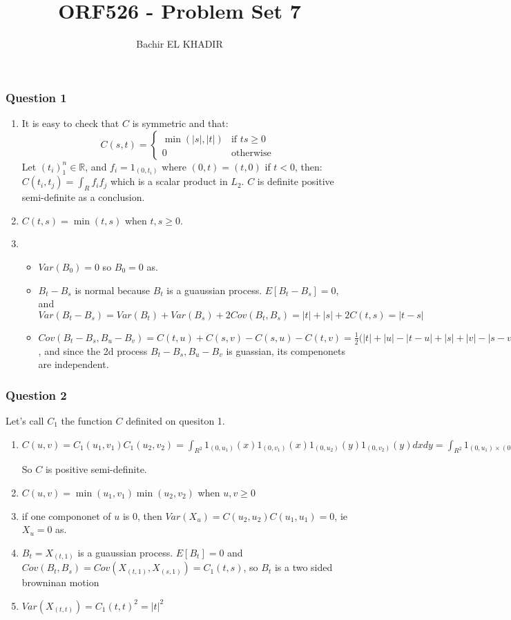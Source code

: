 \documentclass[12pt]{article}
\title{ORF526 - Problem Set 7}
\author{Bachir EL KHADIR }
\newcommand{\Q}[1]{\subsubsection*{Question #1}}
\begin{document}
\maketitle

\Q{1} 
\begin{enumerate}
\item
  It is easy to check that $C$ is symmetric and that:
\[
C(s,t) = \left\{ \begin{array}{cc}\min(|s|, |t|) & \text{if } ts \geq 0 \\ 0 & \text{otherwise}\end{array} \right.
\]
  Let $(t_i)_1^n \in \mathbb{R}$, and $f_i = 1_{(0, t_i)}$ where 
$(0, t) = (t, 0)$ if $t < 0$, then:  $C(t_i, t_j) = \int_R f_i f_j$ which is a scalar product in $L_2$.
  $C$ is definite positive semi-definite as a conclusion.

\item $C(t, s) = \min(t, s)$ when $t, s \ge 0$.

\item \begin{itemize} 
\item $Var(B_0) = 0$ so $B_0 = 0$ as. 
\item $B_t - B_s$ is normal because $B_t$ is a guaussian process.
  $E[B_t - B_s] = 0$, and $Var(B_t - B_s) = Var(B_t) + Var(B_s) + 2 Cov(B_t, B_s) = |t| + |s| + 2 C(t,s) = |t-s|$
\item $Cov(B_t - B_s, B_u - B_v) = C(t,u) + C(s, v) - C(s, u) - C(t, v) = \frac 1 2 (|t| + |u| - |t-u| + |s| + |v| - |s-v| - |s| - |u| + |s-u| - |t| - |v| + |t-v| = \frac12 ( u -t + v - s + u - s + v - t) = 0$, and since  the 2d process $B_t - B_s, B_u - B_v$ is guassian, its compenonets are independent.
\end{itemize}
\end{enumerate}

\Q{2}
Let's call $C_1$ the function $C$ definited on quesiton 1.
\begin{enumerate}
\item $C(u, v) = C_1(u_1, v_1) C_1(u_2, v_2) = \int_{R^{2}} 1_{(0, u_1)}(x)1_{(0, v_1)}(x) 1_{(0, u_2)}(y)1_{(0, v_2)}(y)dx dy = \int_{R^2} 1_{(0, u_1) \times (0, u_2)}1_{(0, v_1) \times (0, v_2)} = \, <1_{(0, u_1) \times (0, u_2)},1_{(0, v_1) \times (0, v_2)}>$

So $C$ is positive semi-definite.

\item  $C(u, v) = \min(u_1, v_1) \min(u_2, v_2)$ when $u, v \ge 0$

\item if one compononet of $u$ is $0$, then $Var(X_u) = C(u_2, u_2)C(u_1, u_1) = 0$, ie $X_u = 0$ as.

\item $B_t = X_{(t,1)}$ is a guaussian process. $E[B_t] = 0$ and $Cov(B_t, B_s) = Cov(X_{(t,1)}, X_{(s,1)}) = C_1(t, s)$, so $B_t$ is a two sided browninan motion

\item $Var(X_{(t, t)}) = C_1(t,t)^2 = |t|^{2}$
\end{enumerate}
\end{document}
